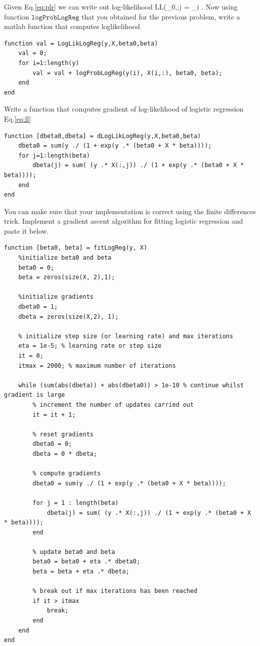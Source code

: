 \documentclass{article}
\begin{document}
\newproblem{1pt}
Given Eq.\eqref{eq:plr} we can write out log-likelihood
\BEQ \label{eq:ll}
\textrm{LL}(\beta_0,\beta;) = \sum_i \log {}.
\EEQ
Now using function $\texttt{logProbLogReg}$ that you obtained for the previous problem, write a matlab function that computes loglikelihood
\begin{verbatim}
function val = LogLikLogReg(y,X,beta0,beta)
    val = 0;
    for i=1:length(y)
        val = val + logProbLogReg(y(i), X(i,:), beta0, beta);
    end
end
\end{verbatim}
\newproblem{1pt}
Write a function that computes gradient of log-likelihood of logistic regression Eq.\eqref{eq:ll}
\begin{verbatim}
function [dbeta0,dbeta] = dLogLikLogReg(y,X,beta0,beta)
    dbeta0 = sum(y ./ (1 + exp(y .* (beta0 + X * beta))));
    for j=1:length(beta)
        dbeta(j) = sum( (y .* X(:,j)) ./ (1 + exp(y .* (beta0 + X * beta))));            
    end
end
\end{verbatim}
You can make sure that your implementation is correct using the finite differences trick.
\newproblem{1pt}
Implement a gradient ascent algorithm for fitting logistic regression and paste it below.
\begin{verbatim}
function [beta0, beta] = fitLogReg(y, X)    
    %initialize beta0 and beta
    beta0 = 0;
    beta = zeros(size(X, 2),1);

    %initialize gradients
    dbeta0 = 1;
    dbeta = zeros(size(X,2), 1);
    
    % initialize step size (or learning rate) and max iterations
    eta = 1e-5; % learning rate or step size    
    it = 0; 
    itmax = 2000; % maximum number of iterations    
        
    while (sum(abs(dbeta)) + abs(dbeta0)) > 1e-10 % continue whilst gradient is large        
        % increment the number of updates carried out
        it = it + 1; 
        
        % reset gradients
        dbeta0 = 0; 
        dbeta = 0 * dbeta;
        
        % compute gradients
        dbeta0 = sum(y ./ (1 + exp(y .* (beta0 + X * beta))));
                
        for j = 1 : length(beta)                            
            dbeta(j) = sum( (y .* X(:,j)) ./ (1 + exp(y .* (beta0 + X * beta))));
        end
        
        % update beta0 and beta
        beta0 = beta0 + eta .* dbeta0;
        beta = beta + eta .* dbeta;        

        % break out if max iterations has been reached
        if it > itmax
            break; 
        end
    end   
end
\end{verbatim}
\end{document}
